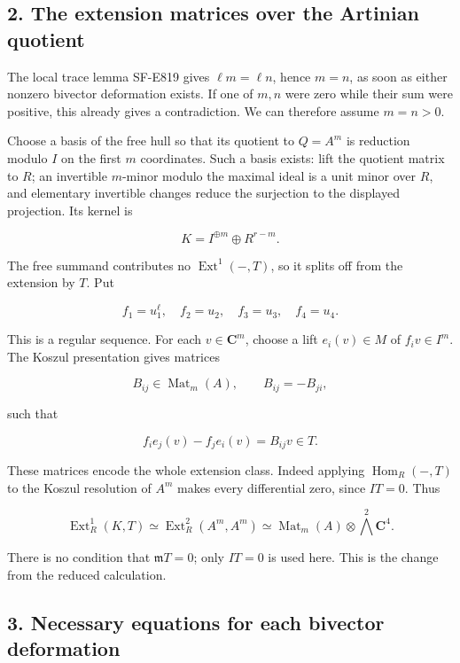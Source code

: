 \subsection{2. The extension matrices over the Artinian
quotient}\label{SF-E820-the-extension-matrices-over-the-artinian-quotient}

The local trace lemma SF-E819 gives \(\ell m=\ell n\), hence \(m=n\), as
soon as either nonzero bivector deformation exists. If one of \(m,n\)
were zero while their sum were positive, this already gives a
contradiction. We can therefore assume \(m=n>0\).

Choose a basis of the free hull so that its quotient to \(Q=A^m\) is
reduction modulo \(I\) on the first \(m\) coordinates. Such a basis
exists: lift the quotient matrix to \(R\); an invertible \(m\)-minor
modulo the maximal ideal is a unit minor over \(R\), and elementary
invertible changes reduce the surjection to the displayed projection.
Its kernel is

\[
 K=I^{\oplus m}\oplus R^{r-m}.
 \tag{E820.4}
\]

The free summand contributes no \(\operatorname{Ext}^1(-,T)\), so it
splits off from the extension by \(T\). Put

\[
 f_1=u_1^\ell,\quad f_2=u_2,\quad f_3=u_3,\quad f_4=u_4.
\]

This is a regular sequence. For each \(v\in\mathbf C^m\), choose a lift
\(e_i(v)\in M\) of \(f_i v\in I^m\). The Koszul presentation gives
matrices

\[
 B_{ij}\in\operatorname{Mat}_m(A),\qquad B_{ij}=-B_{ji},
\]

such that

\[
 f_i e_j(v)-f_j e_i(v)=B_{ij}v\in T.
 \tag{E820.5}
\]

These matrices encode the whole extension class. Indeed applying
\(\operatorname{Hom}_R(-,T)\) to the Koszul resolution of \(A^m\) makes
every differential zero, since \(I T=0\). Thus

\[
 \operatorname{Ext}^1_R(K,T)
  \simeq\operatorname{Ext}^2_R(A^m,A^m)
  \simeq\operatorname{Mat}_m(A)\otimes\bigwedge^2\mathbf C^4.
 \tag{E820.6}
\]

There is no condition that \(\mathfrak m T=0\); only \(I T=0\) is used
here. This is the change from the reduced calculation.

\subsection{3. Necessary equations for each bivector
deformation}\label{SF-E820-necessary-equations-for-each-bivector-deformation}

